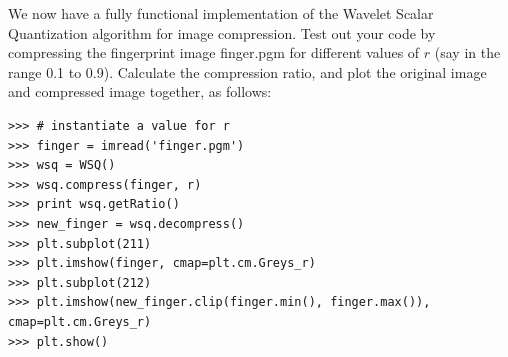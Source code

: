 We now have a fully functional implementation of the Wavelet Scalar Quantization algorithm for image compression.
Test out your code by compressing the fingerprint image finger.pgm for different values of $r$ (say in the range
0.1 to 0.9).
Calculate the compression ratio, and plot the original image and compressed image together, as follows:
\begin{lstlisting}
>>> # instantiate a value for r
>>> finger = imread('finger.pgm')
>>> wsq = WSQ()
>>> wsq.compress(finger, r)
>>> print wsq.getRatio()
>>> new_finger = wsq.decompress()
>>> plt.subplot(211)
>>> plt.imshow(finger, cmap=plt.cm.Greys_r)
>>> plt.subplot(212)
>>> plt.imshow(new_finger.clip(finger.min(), finger.max()), cmap=plt.cm.Greys_r)
>>> plt.show()
\end{lstlisting}



